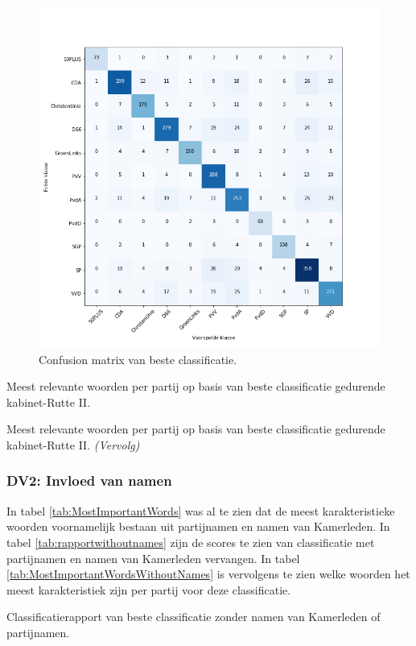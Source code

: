 \begin{figure}[H]
  \centering
    \includegraphics[width=0.60\paperwidth]{Verslag/Tables/confusionmatrix.png}
\caption{Confusion matrix van beste classificatie.}
\label{fig:confusionmatrix}
\end{figure}



\begin{table}[H]
\caption{Meest relevante woorden per partij op basis van beste classificatie gedurende kabinet-Rutte II.} 

\label{tab:MostImportantWords} 
\centering
\hspace*{-1in}
 
\end{table} 
\addtocounter{table}{-1} 
\begin{table}[H]
\caption{Meest relevante woorden per partij op basis van beste classificatie gedurende kabinet-Rutte II. \emph{(Vervolg)}} 
\centering
\hspace*{-1in}
 
\end{table}

\subsubsection{DV2: Invloed van namen}
In tabel \ref{tab:MostImportantWords} was al te zien dat de meest karakteristieke woorden voornamelijk bestaan uit partijnamen en namen van Kamerleden. In tabel \ref{tab:rapportwithoutnames} zijn de scores te zien van classificatie met partijnamen en namen van Kamerleden vervangen. In tabel \ref{tab:MostImportantWordsWithoutNames} is vervolgens te zien welke woorden het meest karakteristiek zijn per partij voor deze classificatie.
\begin{table}[H]
\caption{Classificatierapport van beste classificatie zonder namen van Kamerleden of partijnamen.}
\label{tab:rapportwithoutnames}
\centering

\end{table}

